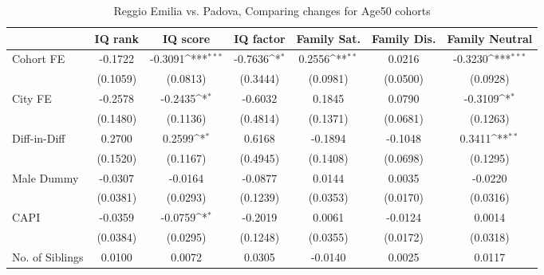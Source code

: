 \begin{table}[htbp]\centering
\def\sym#1{\ifmmode^{#1}\else\(^{#1}\)\fi}
\caption{Reggio Emilia vs. Padova, Comparing changes for Age50 cohorts}
\begin{tabular}{l*{6}{c}}
\toprule
            &\multicolumn{1}{c}{IQ rank}&\multicolumn{1}{c}{IQ score}&\multicolumn{1}{c}{IQ factor}&\multicolumn{1}{c}{Family Sat.}&\multicolumn{1}{c}{Family Dis.}&\multicolumn{1}{c}{Family Neutral}\\
\midrule
Cohort FE   &     -0.1722         &     -0.3091\sym{***}&     -0.7636\sym{*}  &      0.2556\sym{**} &      0.0216         &     -0.3230\sym{***}\\
            &    (0.1059)         &    (0.0813)         &    (0.3444)         &    (0.0981)         &    (0.0500)         &    (0.0928)         \\
\addlinespace
City FE     &     -0.2578         &     -0.2435\sym{*}  &     -0.6032         &      0.1845         &      0.0790         &     -0.3109\sym{*}  \\
            &    (0.1480)         &    (0.1136)         &    (0.4814)         &    (0.1371)         &    (0.0681)         &    (0.1263)         \\
\addlinespace
Diff-in-Diff&      0.2700         &      0.2599\sym{*}  &      0.6168         &     -0.1894         &     -0.1048         &      0.3411\sym{**} \\
            &    (0.1520)         &    (0.1167)         &    (0.4945)         &    (0.1408)         &    (0.0698)         &    (0.1295)         \\
\addlinespace
Male Dummy  &     -0.0307         &     -0.0164         &     -0.0877         &      0.0144         &      0.0035         &     -0.0220         \\
            &    (0.0381)         &    (0.0293)         &    (0.1239)         &    (0.0353)         &    (0.0170)         &    (0.0316)         \\
\addlinespace
CAPI        &     -0.0359         &     -0.0759\sym{*}  &     -0.2019         &      0.0061         &     -0.0124         &      0.0014         \\
            &    (0.0384)         &    (0.0295)         &    (0.1248)         &    (0.0355)         &    (0.0172)         &    (0.0318)         \\
\addlinespace
No. of Siblings&      0.0100         &      0.0072         &      0.0305         &     -0.0140         &      0.0025         &      0.0117         \\

\end{tabular}
\end{table}
